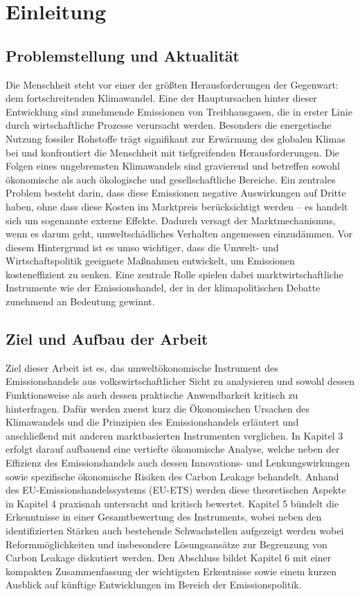 \chapter{Einleitung}

\section{Problemstellung und Aktualität}

Die Menschheit steht vor einer der größten Herausforderungen der Gegenwart: dem fortschreitenden Klimawandel.
Eine der Hauptursachen hinter dieser Entwicklung sind zunehmende Emissionen von Treibhausgasen, die in erster Linie durch wirtschaftliche Prozesse verursacht werden.
Besonders die energetische Nutzung fossiler Rohstoffe trägt signifikant zur Erwärmung des globalen Klimas bei und konfrontiert die Menschheit mit tiefgreifenden Herausforderungen.
Die Folgen eines ungebremsten Klimawandels sind gravierend und betreffen sowohl ökonomische als auch ökologische und gesellschaftliche Bereiche.
Ein zentrales Problem besteht darin, dass diese Emissionen negative Auswirkungen auf Dritte haben, ohne dass diese Kosten im Marktpreis berücksichtigt werden – es handelt sich um sogenannte externe Effekte. Dadurch versagt der Marktmechanismus, wenn es darum geht, umweltschädliches Verhalten angemessen einzudämmen.
Vor diesem Hintergrund ist es umso wichtiger, dass die Umwelt- und Wirtschaftspolitik geeignete Maßnahmen entwickelt, um Emissionen kosteneffizient zu senken. Eine zentrale Rolle spielen dabei marktwirtschaftliche Instrumente wie der Emissionshandel, der in der klimapolitischen Debatte zunehmend an Bedeutung gewinnt.

\section{Ziel und Aufbau der Arbeit}

Ziel dieser Arbeit ist es, das umweltökonomische Instrument des Emissionshandels aus volkswirtschaftlicher Sicht zu analysieren und sowohl dessen Funktionsweise als auch dessen praktische Anwendbarkeit kritisch zu hinterfragen.
Dafür werden zuerst kurz die Ökonomischen Ursachen des Klimawandels und die Prinzipien des Emissionshandels erläutert und anschließend mit anderen marktbasierten Instrumenten verglichen. 
In Kapitel 3 erfolgt darauf aufbauend eine vertiefte ökonomische Analyse, welche neben der Effizienz des Emissionshandels auch dessen Innovations- und Lenkungswirkungen sowie spezifische ökonomische Risiken des Carbon Leakage behandelt.
Anhand des EU-Emissionshandelssystems (EU-ETS) werden diese theoretischen Aspekte in Kapitel 4 praxisnah untersucht und kritisch bewertet.
Kapitel 5 bündelt die Erkenntnisse in einer Gesamtbewertung des Instruments, wobei neben den identifizierten Stärken auch bestehende Schwachstellen aufgezeigt werden wobei Reformmöglichkeiten und insbesondere Lösungsansätze zur Begrenzung von Carbon Leakage diskutiert werden.
Den Abschluss bildet Kapitel 6 mit einer kompakten Zusammenfassung der wichtigsten Erkentnisse sowie einem kurzen Ausblick auf künftige Entwicklungen im Bereich der Emissionspolitik.


\nocite{*}

